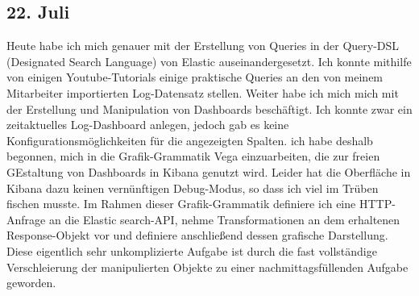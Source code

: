 \subsection{22. Juli}
Heute habe ich mich genauer mit der Erstellung von Queries in der Query-DSL (Designated Search Language) von Elastic auseinandergesetzt. Ich konnte mithilfe von einigen Youtube-Tutorials einige praktische Queries an den von meinem Mitarbeiter importierten Log-Datensatz stellen. Weiter habe ich mich mich mit der Erstellung und Manipulation von Dashboards beschäftigt. Ich konnte zwar ein zeitaktuelles Log-Dashboard anlegen, jedoch gab es keine Konfigurationsmöglichkeiten für die angezeigten Spalten. ich habe deshalb begonnen, mich in die Grafik-Grammatik Vega einzuarbeiten, die zur freien GEstaltung von Dashboards in Kibana genutzt wird. Leider hat die Oberfläche in Kibana dazu keinen vernünftigen Debug-Modus, so dass ich viel im Trüben fischen musste. Im Rahmen dieser Grafik-Grammatik definiere ich eine HTTP-Anfrage an die Elastic search-API, nehme Transformationen an dem erhaltenen Response-Objekt vor und definiere anschließend dessen grafische Darstellung. Diese eigentlich sehr unkomplizierte Aufgabe ist durch die fast vollständige Verschleierung der manipulierten Objekte zu einer nachmittagsfüllenden Aufgabe geworden. 